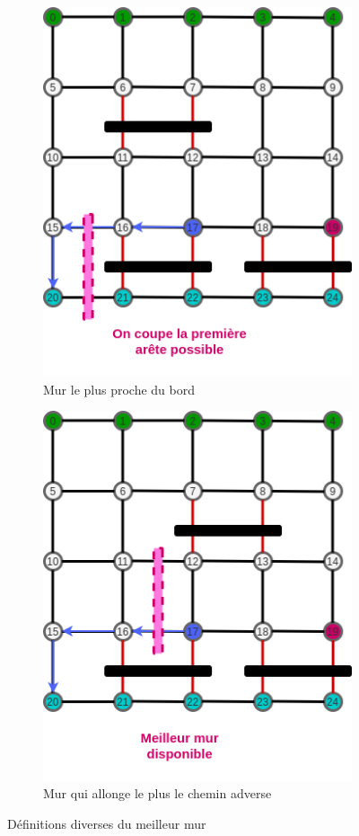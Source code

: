 \documentclass[a4paper]{article}
\begin{document}
\begin{figure}[ht!]
    \centering
    \begin{subfigure}{.5\textwidth}
        \centering
        \includegraphics[scale=0.6]{cut_path3.png}
        \caption{Mur le plus proche du bord}
        \label{fig:cut_path3}
    \end{subfigure}%
    \begin{subfigure}{.5\textwidth}
        \centering
        \includegraphics[scale=0.6]{cut_path4.png}
        \caption{Mur qui allonge le plus le chemin adverse}
        \label{fig:cut_path4}
    \end{subfigure}%

    \caption{Définitions diverses du meilleur mur}
    \label{fig:cut_path_best_wall}
\end{figure}
\end{document}

